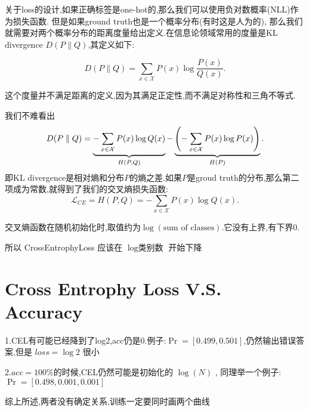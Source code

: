 关于loss的设计,如果正确标签是one-hot的,那么我们可以使用负对数概率(NLL)作为损失函数.
但是如果ground truth也是一个概率分布(有时这是人为的),
那么我们就需要对两个概率分布的距离度量给出定义.在信息论领域常用的度量是KL divergence $D(P \parallel Q)$,其定义如下:

\begin{equation}
	D(P \parallel Q) = \sum_{x \in \mathcal X} P(x) \log \frac{P(x)}{Q(x)}.
\end{equation}

这个度量并不满足距离的定义,因为其满足正定性,而不满足对称性和三角不等式.

我们不难看出
\begin{equation}
	D(P \parallel Q) = \underbrace{-\sum_{x \in \mathcal X} P(x)\log Q(x)}_{H(P, Q)} - \underbrace{\left( -\sum_{x \in \mathcal X} P(x) \log P(x)\right)}_{H(P)}.
\end{equation}
即KL divergence是相对熵和分布$P$的熵之差.如果$P$是groud truth的分布,那么第二项成为常数,就得到了我们的交叉熵损失函数:
\begin{equation}
	\mathcal L_{CE} = H(P, Q) = -\sum_{x \in \mathcal X} P(x) \log Q(x).
\end{equation}

交叉熵函数在随机初始化时,取值约为$\log (\text{sum of classes})$.它没有上界,有下界$0$.

所以 CrossEntrophyLoss 应该在 $\log{\text{类别数}}$ 开始下降

\section{Cross Entrophy Loss V.S. Accuracy}

1.CEL有可能已经降到了log2,acc仍是0.例子:$\Pr=[0.499,0.501]$,仍然输出错误答案,但是 $loss=\log2$ 很小

2.$acc=100\%$的时候,CEL仍然可能是初始化的 $\log(N)$ , 同理举一个例子:$\Pr=[0.498,0.001,0.001]$

综上所述,两者没有确定关系,训练一定要同时画两个曲线